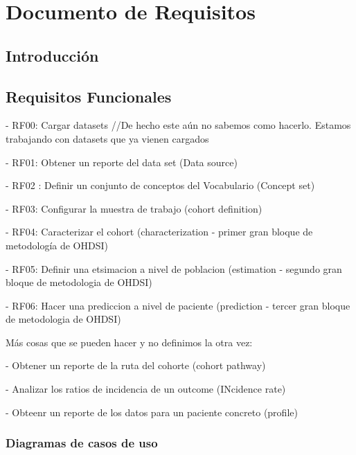 \chapter{Documento de Requisitos}\label{cap:requisitos}

\section{Introducción}




\section{Requisitos Funcionales}

- RF00: Cargar datasets //De hecho este aún no sabemos como hacerlo. Estamos trabajando con datasets que ya vienen cargados

- RF01: Obtener un reporte del data set (Data source)

- RF02 : Definir un conjunto de conceptos del Vocabulario (Concept set)

- RF03: Configurar la muestra de trabajo (cohort definition)

- RF04: Caracterizar el cohort (characterization - primer gran bloque de metodología de OHDSI)

- RF05: Definir una etsimacion a nivel de poblacion (estimation - segundo gran bloque de metodologia de OHDSI)

- RF06: Hacer una prediccion a nivel de paciente (prediction - tercer gran bloque de metodologia de OHDSI)



Más cosas que se pueden hacer y no definimos la otra vez:

- Obtener un reporte de la ruta del cohorte (cohort pathway)

- Analizar los ratios de incidencia de un outcome (INcidence rate)

- Obteenr un reporte de los datos para un paciente concreto (profile)

\subsection{Diagramas de casos de uso}


